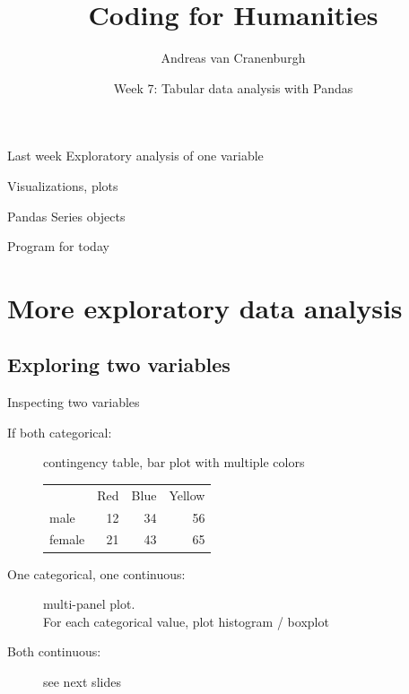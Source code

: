 \documentclass[aspectratio=169,usenames,dvipsnames]{beamer}
\title{Coding for Humanities}
\author{Andreas van Cranenburgh}
\date{Week 7: Tabular data analysis with Pandas}
\begin{document}
\maketitle


\begin{frame}{Last week}
    Exploratory analysis of one variable

    \vspace{1em}
    Visualizations, plots

    \vspace{1em}
    Pandas Series objects
\end{frame}

\begin{frame}{Program for today}
\tableofcontents
\end{frame}



\section{More exploratory data analysis}
\subsection{Exploring two variables}
\frame{\tableofcontents[currentsubsection]}

\begin{frame}{Inspecting two variables}
\begin{description}
    \item[If both categorical:]
            contingency table, bar plot with multiple colors

            \vspace{1em}
            \begin{tabular}{lrrr}
                & Red & Blue & Yellow \\
            male   & 12  & 34 & 56 \\
            female & 21  & 43 & 65 \\
            \end{tabular}
    \item[One categorical, one continuous:] multi-panel plot. \\
            For each categorical value, plot histogram / boxplot
    \item[Both continuous:]
        see next slides
\end{description}
\end{frame}
\end{document}
